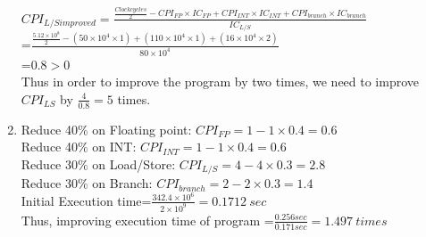 \documentclass[]{article}
\begin{document}
\begin{enumerate}[(1)]
$CPI_{L/Simproved} =\frac{\frac{Clockcycles}{2}-CPI_{FP}\times IC_{FP}+CPI_{INT}\times IC_{INT}+CPI_{branch}\times IC_{branch}}{IC_{L/S}}$
\\\hspace*{16.8ex}=$\frac{\frac{5.12\times 10^8}{2}-(50\times 10^4\times 1)+(110\times 10^4\times 1)+(16\times 10^4\times 2)}{80\times 10^4}$
\\\hspace*{16.8ex}=$0.8>0$
\\Thus in order to improve the program by two times, we need to improve $CPI_{LS}$ by $\frac{4}{0.8}=5$ times.
\item Reduce 40$\%$ on Floating point: $CPI_{FP}=1-1\times0.4=0.6$
\\Reduce 40$\%$ on INT: $CPI_{INT}=1-1\times0.4=0.6$
\\Reduce 30$\%$ on Load/Store: $CPI_{L/S}=4-4\times0.3=2.8$
\\Reduce 30$\%$ on Branch: $CPI_{branch}=2-2\times0.3=1.4$
\\Initial Execution time=$\frac{342.4\times 10^6}{2\times10^9} = 0.1712\ sec$
\\Thus, improving execution time of program =$\frac{0.256sec}{0.171sec}=1.497\ times$
\end{enumerate}
\end{document}
